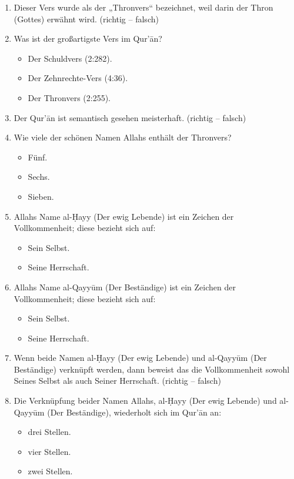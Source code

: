\begin{enumerate}[leftmargin=1.6em,resume]
\item Dieser Vers wurde als der „Thronvers“ bezeichnet, weil darin der Thron (Gottes) erwähnt
  wird. (richtig -- falsch)
\item Was ist der großartigste Vers im Qur’ān?
  \begin{itemize}
    \item Der Schuldvers (2:282).
    \item Der Zehnrechte-Vers (4:36).
    \item Der Thronvers (2:255).
  \end{itemize}
\item Der Qur’ān ist semantisch gesehen meisterhaft. (richtig -- falsch)
\item Wie viele der schönen Namen Allahs enthält der Thronvers?
  \begin{itemize}
    \item Fünf. \item Sechs. \item Sieben.
  \end{itemize}
\item Allahs Name al-Ḥayy (Der ewig Lebende) ist ein Zeichen der Vollkommenheit; diese bezieht
  sich auf:
  \begin{itemize}
    \item Sein Selbst. \item Seine Herrschaft.
  \end{itemize}
\item Allahs Name al-Qayyūm (Der Beständige) ist ein Zeichen der Vollkommenheit; diese bezieht
  sich auf:
  \begin{itemize}
    \item Sein Selbst. \item Seine Herrschaft.
  \end{itemize}
\item Wenn beide Namen al-Ḥayy (Der ewig Lebende) und al-Qayyūm (Der Beständige) verknüpft
  werden, dann beweist das die Vollkommenheit sowohl Seines Selbst als auch Seiner Herrschaft.
  (richtig -- falsch)
\item Die Verknüpfung beider Namen Allahs, al-Ḥayy (Der ewig Lebende) und al-Qayyūm (Der
  Beständige), wiederholt sich im Qur’ān an:
  \begin{itemize}
    \item drei Stellen. \item vier Stellen. \item zwei Stellen.

\end{itemize}
\end{enumerate}
